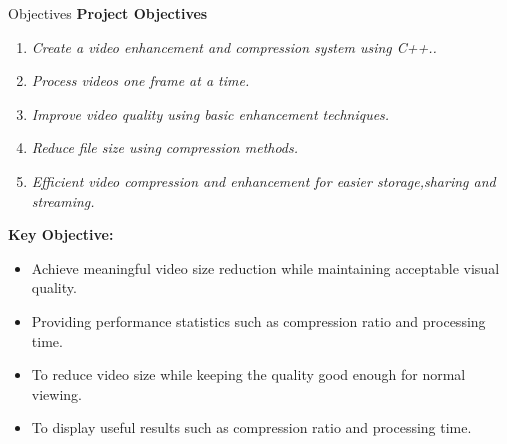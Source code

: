 \documentclass[aspectratio=169,11pt]{beamer}
\newcommand{\placeholder}[1]{\textit{\color{GEUGrey}#1}}
\begin{document}
\begin{frame}{Objectives}
\textbf{\color{GEUBlue}Project Objectives}
\vspace{1mm}
\begin{enumerate}\itemsep0pt
\item \placeholder{Create a video enhancement and compression system using C++..}
\item \placeholder{Process videos one frame at a time.}
\item \placeholder{Improve video quality using basic enhancement techniques.}
\item \placeholder{Reduce file size using compression methods.}
\item \placeholder{Efficient video compression and enhancement for easier storage,sharing and streaming.}
\end{enumerate}
\vspace{0.5mm}

\begin{center}

\colorbox{GEULightBlue}
{
\parbox{.88\textwidth}
{
\scriptsize

\textbf{Key Objective:}

\begin{itemize}

\setlength{\itemsep}{0.2pt}
\setlength{\leftmargini}{1.2em}

\scriptsize

\item
Achieve meaningful video size reduction while maintaining acceptable visual quality.

\item
Providing performance statistics such as compression ratio and processing time.

\item
To reduce video size while keeping the quality good enough for normal viewing.

\item
To display useful results such as compression ratio and processing time.

\end{itemize}

}
}

\end{center}

\end{frame}
\end{document}
